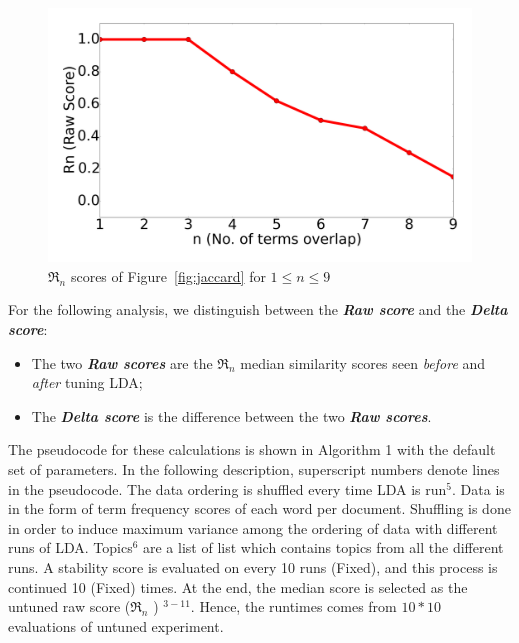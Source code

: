 \documentclass[10pt,conference]{IEEEtran}
\newcommand{\bi}{\begin{itemize}}
\newcommand{\ei}{\end{itemize}}
\theoremstyle{break}
\begin{document}
  \begin{figure}[!h]
  \includegraphics[width=\linewidth]{./fig/alln.png}
  \caption{$\Re_n$ scores of 
  Figure~\ref{fig:jaccard} for $1 \le n \le 9$}
  \label{fig:alln}
\end{figure}

 For the following analysis,
we distinguish between the \textbf{\textit{Raw  score}} and the \textbf{\textit{Delta  score}}:
 \bi
\item The two \textbf{\textit{Raw  scores}} are the $\Re_n$ median similarity scores seen {\em before} and {\em after} tuning LDA;
\item The \textbf{\textit{Delta score}} is the difference between the two
  \textbf{\textit{Raw scores}}.  \ei 
  The pseudocode for these calculations
  is shown in Algorithm 1 with the default set of parameters. In the following
  description, superscript numbers denote lines in the pseudocode. The data ordering is
  shuffled every time LDA is run$^{5}$. Data is in the form of term frequency
  scores of each word per document. Shuffling is done in order to induce maximum
  variance among the ordering of data with  different runs of LDA. Topics$^{6}$ are a list of list which
  contains topics from all the different runs. A stability score is evaluated on
  every 10 runs (Fixed), and this process is continued 10 (Fixed) times. At the end, the median
  score is selected as the untuned raw score ($\Re_n$ ) $^{3-11}$. Hence, the runtimes comes from $10 * 10$ evaluations of untuned experiment.
\end{document}
